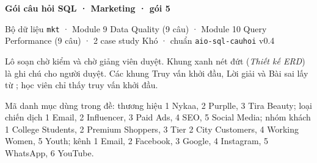 \documentclass[11pt,a4paper]{article}
\begin{document}
{\LARGE\bfseries Gói câu hỏi SQL · Marketing · gói 5\par}
\medskip
{\color{cqMuted}Bộ dữ liệu \texttt{mkt} · Module 9 Data Quality (9 câu) · Module 10 Query Performance (9 câu) · 2 case study Khó · chuẩn \texttt{aio-sql-cauhoi} v0.4\par}
\bigskip
Lô soạn chờ kiểm và chờ giảng viên duyệt. Khung xanh nét đứt (\emph{Thiết kế ERD}) là ghi chú cho người duyệt. Các khung Truy vấn khởi đầu, Lời giải và Bài sai lấy từ ; học viên chỉ thấy truy vấn khởi đầu.

Mã danh mục dùng trong đề: thương hiệu  1 Nykaa, 2 Purplle, 3 Tira Beauty; loại chiến dịch  1 Email, 2 Influencer, 3 Paid Ads, 4 SEO, 5 Social Media; nhóm khách  1 College Students, 2 Premium Shoppers, 3 Tier 2 City Customers, 4 Working Women, 5 Youth; kênh  1 Email, 2 Facebook, 3 Google, 4 Instagram, 5 WhatsApp, 6 YouTube.

\tableofcontents


\end{document}
